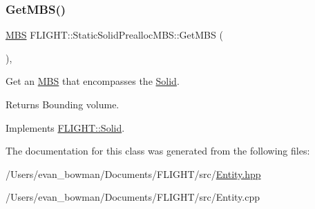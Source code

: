 \subsubsection{\texorpdfstring{Get\+M\+B\+S()}{GetMBS()}}
{\footnotesize\ttfamily \hyperlink{class_f_l_i_g_h_t_1_1_m_b_s}{M\+BS} F\+L\+I\+G\+H\+T\+::\+Static\+Solid\+Prealloc\+M\+B\+S\+::\+Get\+M\+BS (\begin{DoxyParamCaption}{ }\end{DoxyParamCaption})\hspace{0.3cm}{\ttfamily [override]}, {\ttfamily [virtual]}}



Get an \hyperlink{class_f_l_i_g_h_t_1_1_m_b_s}{M\+BS} that encompasses the \hyperlink{class_f_l_i_g_h_t_1_1_solid}{Solid}. 

\begin{DoxyReturn}{Returns}
Bounding volume. 
\end{DoxyReturn}


Implements \hyperlink{class_f_l_i_g_h_t_1_1_solid_ad96c0c336a3d32fcd4dee3c35043c862}{F\+L\+I\+G\+H\+T\+::\+Solid}.



The documentation for this class was generated from the following files\+:\begin{DoxyCompactItemize}
\item 
/\+Users/evan\+\_\+bowman/\+Documents/\+F\+L\+I\+G\+H\+T/src/\hyperlink{_entity_8hpp}{Entity.\+hpp}\item 
/\+Users/evan\+\_\+bowman/\+Documents/\+F\+L\+I\+G\+H\+T/src/Entity.\+cpp\end{DoxyCompactItemize}
